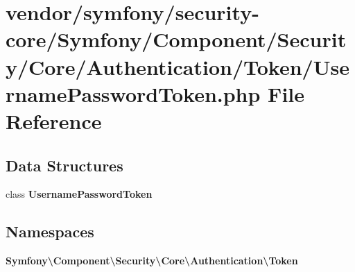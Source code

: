 \section{vendor/symfony/security-\/core/\+Symfony/\+Component/\+Security/\+Core/\+Authentication/\+Token/\+Username\+Password\+Token.php File Reference}
\label{_username_password_token_8php}
\subsection*{Data Structures}
\begin{DoxyCompactItemize}
\item 
class {\bf Username\+Password\+Token}
\end{DoxyCompactItemize}
\subsection*{Namespaces}
\begin{DoxyCompactItemize}
\item 
 {\bf Symfony\textbackslash{}\+Component\textbackslash{}\+Security\textbackslash{}\+Core\textbackslash{}\+Authentication\textbackslash{}\+Token}
\end{DoxyCompactItemize}
